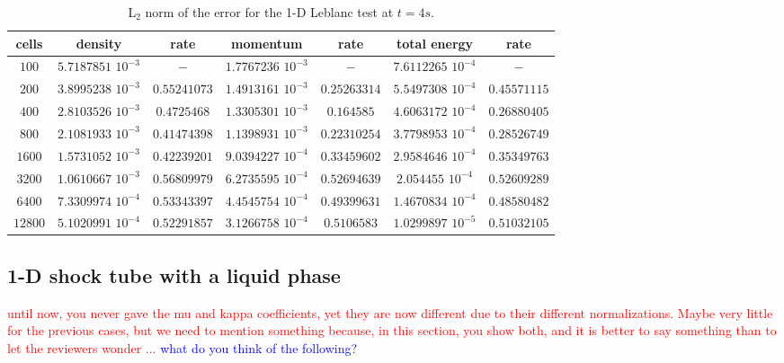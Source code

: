 \documentclass[preprint,10pt]{elsarticle}
\newcommand{\tcr}[1]{\textcolor{red}{#1}}
\newcommand{\tcb}[1]{\textcolor{blue}{#1}}
\begin{document}
\begin{table}[!htbp]
\begin{center}
 \caption{\label{tbl:l2_norm_leblanc} L$_2$ norm of the error for the 1-D Leblanc test at $t=4s$.}
 \begin{tabular}{|c|c|c|c|c|c|c|}
 \hline
   cells & density & rate & momentum & rate & total energy & rate \\ \hline
$100$ &   $5.7187851$ $10^{-3}$ & $-$ & $1.7767236$ $10^{-3}$ & $-$ & $7.6112265$  $10^{-4}$& $-$\\   \hline
$200$  &  $3.8995238$ $10^{-3}$ & $0.55241073$ & $1.4913161$ $10^{-3}$ & $0.25263314$ &  $5.5497308$ $10^{-4}$& $0.45571115$\\ \hline
$400$ & $2.8103526$ $10^{-3}$   & $0.4725468$ & $1.3305301$ $10^{-3}$ & $0.164585$ & $4.6063172$ $10^{-4}$ & $0.26880405$\\ \hline
$800$ & $2.1081933$ $10^{-3}$   & $0.41474398$ & $1.1398931$ $10^{-3}$ & $0.22310254$ & $3.7798953$ $10^{-4}$ & $0.28526749$\\ \hline
$1600$ & $1.5731052$ $10^{-3}$  & $0.42239201$ & $9.0394227$ $10^{-4}$ & $0.33459602$ & $2.9584646$ $10^{-4}$ & $0.35349763$\\ \hline
$3200$&$1.0610667$ $10^{-3}$    & $0.56809979$ & $6.2735595$ $10^{-4}$ & $0.52694639$ & $2.054455$ $10^{-4}$ & $0.52609289$\\ \hline
$6400$&$7.3309974$ $10^{-4}$    & $0.53343397$ & $4.4545754$ $10^{-4}$ & $0.49399631$ & $1.4670834$ $10^{-4}$ & $0.48580482$\\ \hline
 $12800$&$5.1020991$ $10^{-4}$  & $0.52291857$ & $3.1266758$ $10^{-4}$ & $0.5106583$ & $1.0299897$ $10^{-5}$ & $0.51032105$\\  \hline
\end{tabular}
\end{center}
\nonumber
\end{table}

\subsection{1-D shock tube with a liquid phase} \label{sec:liquid_shock}
\tcr{until now, you never gave the mu and kappa coefficients, yet they are now different due to their different normalizations.
Maybe very little for the previous cases, but we need to mention something because, in this section, you show both, and it is better
to say something than to let the reviewers wonder ... } \tcb{what do you think of the following?}
\end{document}
